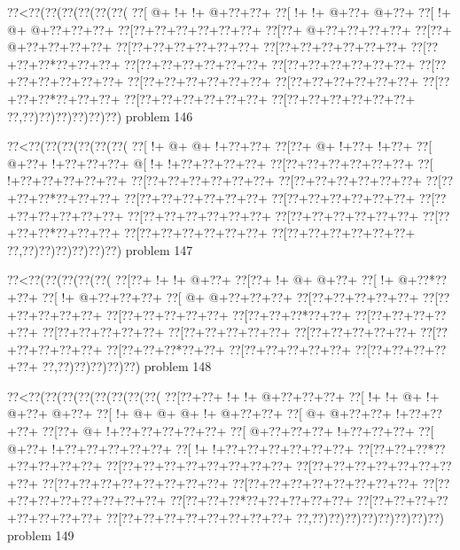 \vbox{\vbox{\goo
\0??<\0??(\0??(\0??(\0??(\0??(\0??(
\0??[\- @+\- !+\- !+\- @+\0??+\0??+
\0??[\- !+\- !+\- @+\0??+\- @+\0??+
\0??[\- !+\- @+\- @+\0??+\0??+\0??+
\0??[\0??+\0??+\0??+\0??+\0??+\0??+
\0??[\0??+\- @+\0??+\0??+\0??+\0??+
\0??[\0??+\- @+\0??+\0??+\0??+\0??+
\0??[\0??+\0??+\0??+\0??+\0??+\0??+
\0??[\0??+\0??+\0??+\0??+\0??+\0??+
\0??[\0??+\0??+\0??*\0??+\0??+\0??+
\0??[\0??+\0??+\0??+\0??+\0??+\0??+
\0??[\0??+\0??+\0??+\0??+\0??+\0??+
\0??[\0??+\0??+\0??+\0??+\0??+\0??+
\0??[\0??+\0??+\0??+\0??+\0??+\0??+
\0??[\0??+\0??+\0??+\0??+\0??+\0??+
\0??[\0??+\0??+\0??*\0??+\0??+\0??+
\0??[\0??+\0??+\0??+\0??+\0??+\0??+
\0??[\0??+\0??+\0??+\0??+\0??+\0??+
\0??,\0??)\0??)\0??)\0??)\0??)\0??)
}
\hfil problem 146\hfil\break
}

\vbox{\vbox{\goo
\0??<\0??(\0??(\0??(\0??(\0??(\0??(
\0??[\- !+\- @+\- @+\- !+\0??+\0??+
\0??[\0??+\- @+\- !+\0??+\- !+\0??+
\0??[\- @+\0??+\- !+\0??+\0??+\0??+
\- @[\- !+\- !+\0??+\0??+\0??+\0??+
\0??[\0??+\0??+\0??+\0??+\0??+\0??+
\0??[\- !+\0??+\0??+\0??+\0??+\0??+
\0??[\0??+\0??+\0??+\0??+\0??+\0??+
\0??[\0??+\0??+\0??+\0??+\0??+\0??+
\0??[\0??+\0??+\0??*\0??+\0??+\0??+
\0??[\0??+\0??+\0??+\0??+\0??+\0??+
\0??[\0??+\0??+\0??+\0??+\0??+\0??+
\0??[\0??+\0??+\0??+\0??+\0??+\0??+
\0??[\0??+\0??+\0??+\0??+\0??+\0??+
\0??[\0??+\0??+\0??+\0??+\0??+\0??+
\0??[\0??+\0??+\0??*\0??+\0??+\0??+
\0??[\0??+\0??+\0??+\0??+\0??+\0??+
\0??[\0??+\0??+\0??+\0??+\0??+\0??+
\0??,\0??)\0??)\0??)\0??)\0??)\0??)
}
\hfil problem 147\hfil\break
}

\vbox{\vbox{\goo
\0??<\0??(\0??(\0??(\0??(\0??(
\0??[\0??+\- !+\- !+\- @+\0??+
\0??[\0??+\- !+\- @+\- @+\0??+
\0??[\- !+\- @+\0??*\0??+\0??+
\0??[\- !+\- @+\0??+\0??+\0??+
\0??[\- @+\- @+\0??+\0??+\0??+
\0??[\0??+\0??+\0??+\0??+\0??+
\0??[\0??+\0??+\0??+\0??+\0??+
\0??[\0??+\0??+\0??+\0??+\0??+
\0??[\0??+\0??+\0??*\0??+\0??+
\0??[\0??+\0??+\0??+\0??+\0??+
\0??[\0??+\0??+\0??+\0??+\0??+
\0??[\0??+\0??+\0??+\0??+\0??+
\0??[\0??+\0??+\0??+\0??+\0??+
\0??[\0??+\0??+\0??+\0??+\0??+
\0??[\0??+\0??+\0??*\0??+\0??+
\0??[\0??+\0??+\0??+\0??+\0??+
\0??[\0??+\0??+\0??+\0??+\0??+
\0??,\0??)\0??)\0??)\0??)\0??)
}
\hfil problem 148\hfil\break
}

\vbox{\vbox{\goo
\0??<\0??(\0??(\0??(\0??(\0??(\0??(\0??(\0??(
\0??[\0??+\0??+\- !+\- !+\- @+\0??+\0??+\0??+
\0??[\- !+\- !+\- @+\- !+\- @+\0??+\- @+\0??+
\0??[\- !+\- @+\- @+\- @+\- !+\- @+\0??+\0??+
\0??[\- @+\- @+\0??+\0??+\- !+\0??+\0??+\0??+
\0??[\0??+\- @+\- !+\0??+\0??+\0??+\0??+\0??+
\0??[\- @+\0??+\0??+\0??+\- !+\0??+\0??+\0??+
\0??[\- @+\0??+\- !+\0??+\0??+\0??+\0??+\0??+
\0??[\- !+\- !+\0??+\0??+\0??+\0??+\0??+\0??+
\0??[\0??+\0??+\0??*\0??+\0??+\0??+\0??+\0??+
\0??[\0??+\0??+\0??+\0??+\0??+\0??+\0??+\0??+
\0??[\0??+\0??+\0??+\0??+\0??+\0??+\0??+\0??+
\0??[\0??+\0??+\0??+\0??+\0??+\0??+\0??+\0??+
\0??[\0??+\0??+\0??+\0??+\0??+\0??+\0??+\0??+
\0??[\0??+\0??+\0??+\0??+\0??+\0??+\0??+\0??+
\0??[\0??+\0??+\0??*\0??+\0??+\0??+\0??+\0??+
\0??[\0??+\0??+\0??+\0??+\0??+\0??+\0??+\0??+
\0??[\0??+\0??+\0??+\0??+\0??+\0??+\0??+\0??+
\0??,\0??)\0??)\0??)\0??)\0??)\0??)\0??)\0??)
}
\hfil problem 149\hfil\break
}

